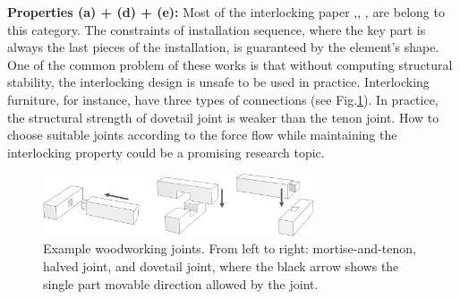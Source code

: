 \vspace*{2mm}
\noindent
{\bf Properties (a) +  (d) + (e):} Most of the interlocking paper \cite{Song-2012-InterCubes},\cite{Xin-2011-BurrPuzzles}, \cite{Song-2016-CoFiFab}, \cite{Fu-2015-Furniture} are belong to this category. The constraints of installation sequence, where the key part is always the last pieces of the installation, is guaranteed by the element's shape. One of the common problem of these works is that without computing structural stability, the interlocking design is unsafe to be used in practice. Interlocking furniture, for instance, have three types of connections (see Fig.\ref{fig:Joints}). In practice, the structural strength of dovetail joint is weaker than the tenon joint. How to choose suitable joints according to the force flow while maintaining the interlocking property could be a promising research topic.
\begin{figure}[!t]
	\centering
	\vspace*{-4.0mm}
	\includegraphics[width=8.00cm]{images/Joints.png}
	\vspace*{-2.5mm}
	\caption{Example woodworking joints. From left to right: mortise-and-tenon, halved joint, and dovetail joint, where the black arrow shows the single part movable direction allowed by the joint.}
	\label{fig:Joints}
\end{figure}

